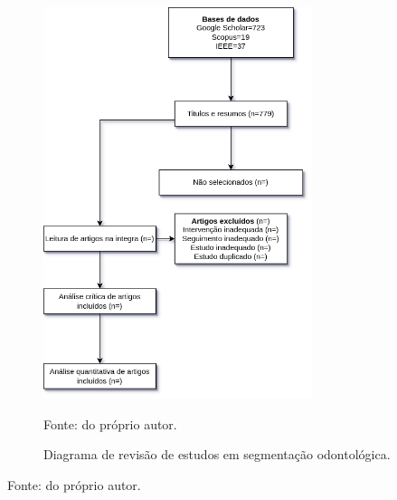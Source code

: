 \begin{figure}[H]
    \centering
    \caption{Diagrama de revisão de estudos em segmentação odontológica.}
    \includegraphics[height=4.5in]{recursos/imagens/proposal/revisao2.png}
    \label{proposal:revision:fig:2}

    \vspace*{1 cm}
    Fonte: do próprio autor.
\end{figure}

\begin{table}[H]
    \centering
    \caption{Trabalhos selecionados a partir da revisão sobre segmentação odontológica.}
    \label{proposal:revision:2}

    \vspace*{1 cm}
    Fonte: do próprio autor.
\end{table}


